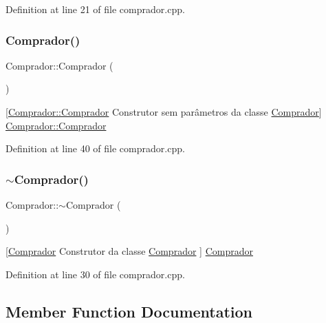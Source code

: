 Definition at line 21 of file comprador.\+cpp.

\mbox{\label{class_comprador_a83fc25fdd74fceee73944bfe801ebe08}} 
\subsubsection{\texorpdfstring{Comprador()}{Comprador()}\hspace{0.1cm}{\footnotesize\ttfamily [2/2]}}
{\footnotesize\ttfamily Comprador\+::\+Comprador (\begin{DoxyParamCaption}{ }\end{DoxyParamCaption})}

\mbox{[}\hyperlink{class_comprador_aa8494892432d46b4c8825a5b435af44d}{Comprador\+::\+Comprador} Construtor sem parâmetros da classe \hyperlink{class_comprador}{Comprador}\mbox{]}  \hyperlink{class_comprador_aa8494892432d46b4c8825a5b435af44d}{Comprador\+::\+Comprador} 

Definition at line 40 of file comprador.\+cpp.

\mbox{\label{class_comprador_a1531e2981ee8279bfc273d28a84c1e32}} 
\subsubsection{\texorpdfstring{$\sim$\+Comprador()}{~Comprador()}}
{\footnotesize\ttfamily Comprador\+::$\sim$\+Comprador (\begin{DoxyParamCaption}{ }\end{DoxyParamCaption})}

\mbox{[}\hyperlink{class_comprador}{Comprador} Construtor da classe \hyperlink{class_comprador}{Comprador} \mbox{]}  \hyperlink{class_comprador}{Comprador} 

Definition at line 30 of file comprador.\+cpp.



\subsection{Member Function Documentation}
\mbox{\label{class_comprador_ab996419e954d24ac9c97e646e81b0c9c}} 
